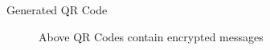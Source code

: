 \begin{frame}{Generated QR Code}
\begin{block}{}
\begin{figure}[h!]
    \caption{Above QR Codes contain encrypted messages}
    \label{fig:two_images}
\end{figure}
        
\end{block}
\end{frame}